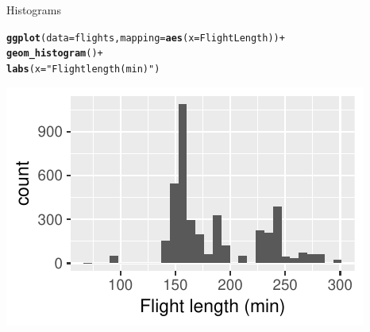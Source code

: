 \documentclass[10pt]{beamer}\usepackage[]{graphicx}\usepackage[]{color}
\makeatletter
\def\maxwidth{ %
  \ifdim\Gin@nat@width>\linewidth
    \linewidth
  \else
    \Gin@nat@width
  \fi
}
\newcommand{\hlstr}[1]{\textcolor[rgb]{0.192,0.494,0.8}{#1}}%
\newcommand{\hlopt}[1]{\textcolor[rgb]{0,0,0}{#1}}%
\newcommand{\hlstd}[1]{\textcolor[rgb]{0.345,0.345,0.345}{#1}}%
\newcommand{\hlkwc}[1]{\textcolor[rgb]{0.333,0.667,0.333}{#1}}%
\newcommand{\hlkwd}[1]{\textcolor[rgb]{0.737,0.353,0.396}{\textbf{#1}}}%
\newenvironment{kframe}{%
 \def\at@end@of@kframe{}%
 \ifinner\ifhmode%
  \def\at@end@of@kframe{\end{minipage}}%
  \begin{minipage}{\columnwidth}%
 \fi\fi%
 \def\FrameCommand##1{\hskip\@totalleftmargin \hskip-\fboxsep
 \colorbox{shadecolor}{##1}\hskip-\fboxsep
     \hskip-\linewidth \hskip-\@totalleftmargin \hskip\columnwidth}%
 \MakeFramed {\advance\hsize-\width
   \@totalleftmargin\z@ \linewidth\hsize
   \@setminipage}}%
 {\par\unskip\endMakeFramed%
 \at@end@of@kframe}
\newenvironment{knitrout}{}{} %
\makeatother
\begin{document}
\begin{frame}[fragile]{Histograms}


\begin{knitrout}\small
{}\color{fgcolor}\begin{kframe}
\begin{alltt}
\hlkwd{ggplot}\hlstd{(}\hlkwc{data} \hlstd{= flights,} \hlkwc{mapping} \hlstd{=} \hlkwd{aes}\hlstd{(}\hlkwc{x} \hlstd{= FlightLength))} \hlopt{+}
  \hlkwd{geom_histogram}\hlstd{()} \hlopt{+}
  \hlkwd{labs}\hlstd{(}\hlkwc{x} \hlstd{=} \hlstr{"Flight length (min)"}\hlstd{)}
\end{alltt}
\end{kframe}
\includegraphics[width=\maxwidth]{figure/unnamed-chunk-16-1} 

\end{knitrout}

\end{frame}

\end{document}
